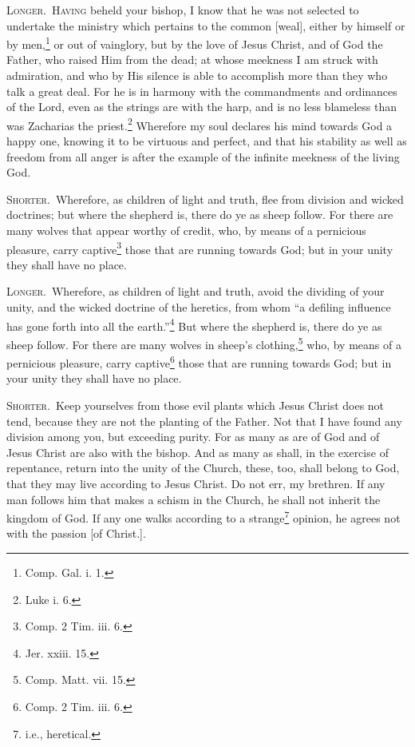 \textsc{Longer.}~\textsc{Having} beheld your bishop, I know that he was not selected to undertake the ministry which pertains to the common [weal], either by himself or by men,\footnote{Comp. Gal. i. 1.} or out of vainglory, but by the love of Jesus Christ, and of God the Father, who raised Him from the dead; at whose meekness I am struck with admiration, and who by His silence is able to accomplish more than they who talk a great deal. For he is in harmony with the commandments and ordinances of the Lord, even as the strings are with the harp, and is no less blameless than was Zacharias the priest.\footnote{Luke i. 6.} Wherefore my soul declares his mind towards God a happy one, knowing it to be virtuous and perfect, and that his stability as well as freedom from all anger is after the example of the infinite meekness of the living God.


\textsc{Shorter.}~Wherefore, as children of light and truth, flee from division and wicked  doctrines; but where the shepherd is, there do ye as sheep follow. For there are many wolves that appear worthy of credit, who, by means of a pernicious pleasure, carry captive\footnote{Comp. 2 Tim. iii. 6.} those that are running towards God; but in your unity they shall have no place.

\textsc{Longer.}~Wherefore, as children of light and truth, avoid the dividing of your unity, and the wicked doctrine of the heretics, from whom “a defiling influence has gone forth into all the earth.”\footnote{Jer. xxiii. 15.} But where the shepherd is, there do ye as sheep follow. For there are many wolves in sheep’s clothing,\footnote{Comp. Matt. vii. 15.} who, by means of a pernicious pleasure, carry captive\footnote{Comp. 2 Tim. iii. 6.} those that are running towards God; but in your unity they shall have no place.


\textsc{Shorter.}~Keep yourselves from those evil plants which Jesus Christ does not tend, because they are not the planting of the Father. Not that I have found any division among you, but exceeding purity. For as many as are of God and of Jesus Christ are also with the bishop. And as many as shall, in the exercise of repentance, return into the unity of the Church, these, too, shall belong to God, that they may live according to Jesus Christ. Do not err, my brethren. If any man follows him that makes a schism in the Church, he shall not inherit the kingdom of God. If any one walks according to a strange\footnote{i.e., heretical.} opinion, he agrees not with the passion [of Christ.].


